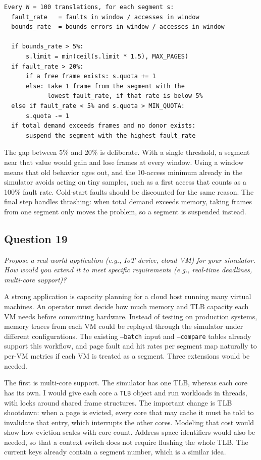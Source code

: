 \documentclass[11pt]{article}
\newcommand{\question}[2]{\subsection*{Question #1}\noindent\textit{#2}\par\medskip}
\newcommand{\code}[1]{\texttt{#1}}
\begin{document}
\begin{lstlisting}
Every W = 100 translations, for each segment s:
  fault_rate   = faults in window / accesses in window
  bounds_rate  = bounds errors in window / accesses in window

  if bounds_rate > 5%:
      s.limit = min(ceil(s.limit * 1.5), MAX_PAGES)
  if fault_rate > 20%:
      if a free frame exists: s.quota += 1
      else: take 1 frame from the segment with the
            lowest fault_rate, if that rate is below 5%
  else if fault_rate < 5% and s.quota > MIN_QUOTA:
      s.quota -= 1
  if total demand exceeds frames and no donor exists:
      suspend the segment with the highest fault_rate
\end{lstlisting}

The gap between 5\% and 20\% is deliberate. With a single threshold, a segment near
that value would gain and lose frames at every window. Using a window means that old
behavior ages out, and the 10-access minimum already in the simulator avoids acting on
tiny samples, such as a first access that counts as a 100\% fault rate. Cold-start
faults should be discounted for the same reason. The final step handles thrashing:
when total demand exceeds memory, taking frames from one segment only moves the
problem, so a segment is suspended instead.

\question{19}{Propose a real-world application (e.g., IoT device, cloud VM) for your simulator. How would you extend it to meet specific requirements (e.g., real-time deadlines, multi-core support)?}
A strong application is capacity planning for a cloud host running many virtual
machines. An operator must decide how much memory and TLB capacity each VM needs
before committing hardware. Instead of testing on production systems, memory traces
from each VM could be replayed through the simulator under different configurations.
The existing \code{--batch} input and \code{--compare} tables already support this
workflow, and page fault and hit rates per segment map naturally to per-VM metrics
if each VM is treated as a segment. Three extensions would be needed.

The first is multi-core support. The simulator has one TLB, whereas each core has its
own. I would give each core a \code{TLB} object and run workloads in threads, with
locks around shared frame structures. The important change is TLB shootdown: when a
page is evicted, every core that may cache it must be told to invalidate that entry,
which interrupts the other cores. Modeling that cost would show how eviction scales
with core count. Address space identifiers would also be needed, so that a context
switch does not require flushing the whole TLB. The current keys already contain a
segment number, which is a similar idea.
\end{document}
